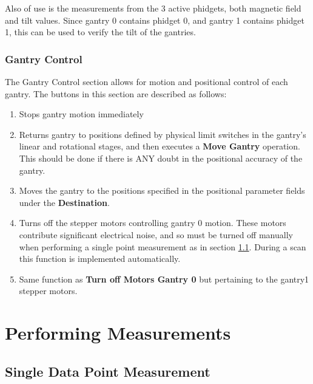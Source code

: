 \documentclass[twoside,letterpaper]{refart}
\begin{document}
Also of use is the measurements from the 3 active phidgets, both magnetic field and tilt values.  Since gantry 0 contains phidget 0, and gantry 1 contains phidget 1, this can be used to verify the tilt of the gantries.  

\subsubsection{Gantry Control}

The Gantry Control section allows for motion and positional control of each gantry.  The buttons in this section are described as follows:

\begin{enumerate}
	
	\item[\textbf{Stop Gantry Now!!}] Stops gantry motion immediately
	
	\item[\textbf{Reinitialize Gantry}] Returns gantry to positions defined by physical limit switches in the gantry's linear and rotational stages, and then executes a \textbf{Move Gantry} operation. This should be done if there is ANY doubt in the positional accuracy of the gantry.
	
	\item[\textbf{Move Gantry}] Moves the gantry to the positions specified in the positional parameter fields under the \textbf{Destination}.  
	
	\item[\textbf{Turn off Motors Gantry 0}] Turns off the stepper motors controlling gantry 0 motion.  These motors contribute significant electrical noise, and so must be turned off manually when performing a single point measurement as in section \ref{singleData}. During a scan this function is implemented automatically.
	
	\item[\textbf{Turn off Motors Gantry 1}] Same function as \textbf{Turn off Motors Gantry 0} but pertaining to the gantry1 stepper motors. 

\end{enumerate}

\clearpage

\label{GantryMove}

\section{Performing Measurements}

\subsection{Single Data Point Measurement} \label{singleData}
\end{document}
